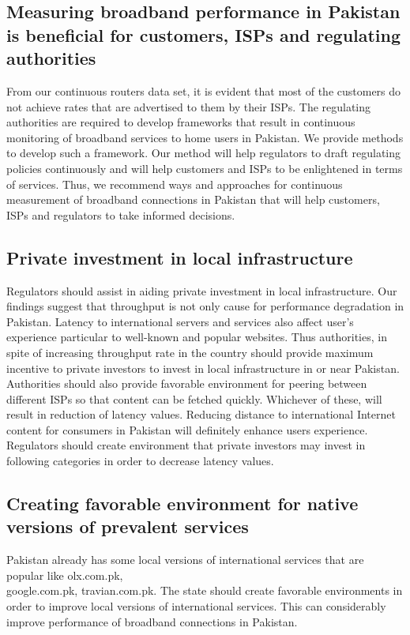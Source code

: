 \documentclass{sig-alternate-10pt}
\begin{document}
\subsection {Measuring broadband performance in Pakistan is beneficial for customers, ISPs and regulating authorities}
\indent From our continuous routers data set, it is evident that most of the customers do not achieve rates that are advertised to them by their ISPs. The regulating authorities are required to develop frameworks that result in continuous monitoring of broadband services to home users in Pakistan. We provide methods to develop such a framework. Our method will help regulators to draft regulating policies continuously and will help customers and ISPs to be enlightened in terms of services. Thus, we recommend ways and approaches for continuous measurement of broadband connections in Pakistan that will help customers, ISPs and regulators to take informed decisions.\\
\subsection {Private investment in local infrastructure}
 \indent Regulators should assist in aiding private investment in local infrastructure. Our findings suggest that throughput is not only cause for performance degradation in Pakistan. Latency to international servers and services also affect user's experience particular to well-known and popular websites. Thus authorities, in spite of increasing throughput rate in the country should provide maximum incentive to private investors to invest in local infrastructure in or near Pakistan. Authorities should also provide favorable environment for peering between different ISPs so that content can be fetched quickly. Whichever of these, will result in reduction of latency values. Reducing distance to international Internet content for consumers in Pakistan will definitely enhance users experience. Regulators should create environment that private investors may invest in following categories in order to decrease latency values.
 \subsection {Creating favorable environment for native versions of prevalent services}
\indent  Pakistan already has some local versions of international services that are popular like olx.com.pk, \\ google.com.pk, travian.com.pk. The state should create favorable environments in order to improve local versions of international services. This can considerably improve performance of broadband connections in Pakistan.
\end{document}
